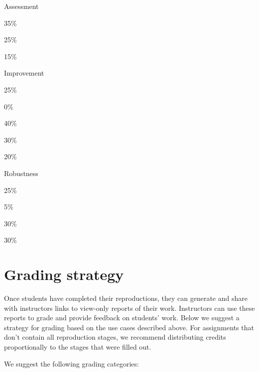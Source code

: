 \documentclass[
]{book}
\begin{document}
Assessment

35\%

25\%

15\%

Improvement

25\%

0\%

40\%

30\%

20\%

Robustness

25\%

5\%

30\%

30\%

\hypertarget{grading-strategy}{%
\section{Grading strategy}\label{grading-strategy}}

Once students have completed their reproductions, they can generate and share with instructors links to view-only reports of their work. Instructors can use these reports to grade and provide feedback on students' work. Below we suggest a strategy for grading based on the use cases described above. For assignments that don't contain all reproduction stages, we recommend distributing credits proportionally to the stages that were filled out.

We suggest the following grading categories:
\end{document}
